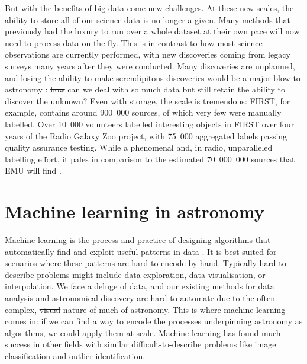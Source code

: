 \documentclass[11pt, a4paper]{book}
\providecommand{\DIFaddtex}[1]{{\protect\color{blue}\uwave{#1}}} %
\providecommand{\DIFdeltex}[1]{{\protect\color{red}\sout{#1}}}                      %
\providecommand{\DIFaddbegin}{} %
\providecommand{\DIFaddend}{} %
\providecommand{\DIFdelbegin}{} %
\providecommand{\DIFdelend}{} %
\providecommand{\DIFadd}[1]{\texorpdfstring{\DIFaddtex{#1}}{#1}} %
\providecommand{\DIFdel}[1]{\texorpdfstring{\DIFdeltex{#1}}{}} %
\newcommand{\DIFscaledelfig}{0.5}
\newlength{\DIFdelgraphicswidth} %
\newlength{\DIFdelgraphicsheight} %
\newcommand{\DIFaddincludegraphics}[2][]{{\color{blue}\fbox{\DIFOincludegraphics[#1]{#2}}}} %
\newcommand{\DIFdelincludegraphics}[2][]{%
\sbox{\DIFdelgraphicsbox}{\DIFOincludegraphics[#1]{#2}}%
\settoboxwidth{\DIFdelgraphicswidth}{\DIFdelgraphicsbox} %
\settoboxtotalheight{\DIFdelgraphicsheight}{\DIFdelgraphicsbox} %
\scalebox{\DIFscaledelfig}{%
\parbox[b]{\DIFdelgraphicswidth}{\usebox{\DIFdelgraphicsbox}\\[-\baselineskip] \rule{\DIFdelgraphicswidth}{0em}}\llap{\resizebox{\DIFdelgraphicswidth}{\DIFdelgraphicsheight}{%
\setlength{\unitlength}{\DIFdelgraphicswidth}%
\begin{picture}(1,1)%
\thicklines\linethickness{2pt} %
{\color[rgb]{1,0,0}\put(0,0){\framebox(1,1){}}}%
{\color[rgb]{1,0,0}\put(0,0){\line( 1,1){1}}}%
{\color[rgb]{1,0,0}\put(0,1){\line(1,-1){1}}}%
\end{picture}%
}\hspace*{3pt}}} %
} %
\DeclareRobustCommand{\DIFaddbegin}{\DIFOaddbegin \let\includegraphics\DIFaddincludegraphics} %
\DeclareRobustCommand{\DIFaddend}{\DIFOaddend \let\includegraphics\DIFOincludegraphics} %
\DeclareRobustCommand{\DIFdelbegin}{\DIFOdelbegin \let\includegraphics\DIFdelincludegraphics} %
\DeclareRobustCommand{\DIFdelend}{\DIFOaddend \let\includegraphics\DIFOincludegraphics} %
\begin{document}
    But with the benefits of big data come new challenges. At these new scales, the ability to store all of our science data is no longer a given. Many methods that previously had the luxury to run over a whole dataset at their own pace will now need to process data on-the-fly. This is in contrast to how most science observations are currently performed, with new discoveries coming from legacy surveys many years after they were conducted. Many discoveries are unplanned, and losing the ability to make serendipitous discoveries would be a major blow to astronomy \citep{norris17unexpected}: \DIFdelbegin \DIFdel{how }\DIFdelend \DIFaddbegin \DIFadd{How }\DIFaddend can we deal with so much data but still retain the ability to discover the unknown? Even with storage, the scale is tremendous: FIRST, for example, contains around 900~000 sources, of which very few were manually labelled. Over 10~000 volunteers labelled interesting objects in FIRST over four years of the Radio Galaxy Zoo project, with 75~000 aggregated labels passing quality assurance testing. While a phenomenal and, in radio, unparalleled labelling effort, it pales in comparison to the estimated 70~000~000 sources that EMU will find \citep{banfield15}.

\section{Machine learning in astronomy}
\label{sec:ml-in-astro}

    Machine learning is the process and practice of designing algorithms that automatically find and exploit useful patterns in data \citep{deisenroth_mathematics_2020}. It is best suited for scenarios where these patterns are hard to encode by hand. Typically hard-to-describe problems might include data exploration, data visualisation, or interpolation. We face a deluge of data, and our existing methods for data analysis and astronomical discovery are hard to automate due to the often complex, \DIFdelbegin \DIFdel{visual }\DIFdelend \DIFaddbegin \DIFadd{imagery-based }\DIFaddend nature of much of astronomy. This is where machine learning comes in: \DIFdelbegin \DIFdel{if we can }\DIFdelend \DIFaddbegin \DIFadd{If we could }\DIFaddend find a way to encode the processes underpinning astronomy as algorithms, we could apply them at scale. Machine learning has found much success in other fields with similar difficult-to-describe problems like image classification and outlier identification.
\end{document}
